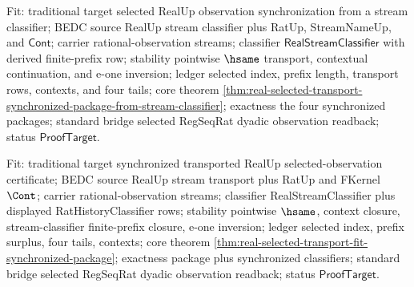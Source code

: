 Fit: traditional target selected RealUp observation synchronization from a
stream classifier; BEDC source RealUp stream classifier plus RatUp,
StreamNameUp, and $\mathsf{Cont}$; carrier rational-observation streams;
classifier $\mathsf{RealStreamClassifier}$ with derived finite-prefix row;
stability pointwise $\hsame$ transport, contextual continuation, and e-one
inversion; ledger selected index, prefix length, transport rows, contexts, and
four tails; core theorem
\autoref{thm:real-selected-transport-synchronized-package-from-stream-classifier};
exactness the four synchronized packages; standard bridge selected RegSeqRat
dyadic observation readback; status $\mathsf{ProofTarget}$.

Fit: traditional target synchronized transported RealUp selected-observation
certificate; BEDC source RealUp stream transport plus RatUp and FKernel
$\Cont$; carrier rational-observation streams; classifier RealStreamClassifier
plus displayed RatHistoryClassifier rows; stability pointwise $\hsame$, context
closure, stream-classifier finite-prefix closure, e-one inversion; ledger
selected index, prefix surplus, four tails, contexts; core theorem
\autoref{thm:real-selected-transport-fit-synchronized-package}; exactness
package plus synchronized classifiers; standard bridge selected RegSeqRat
dyadic observation readback; status $\mathsf{ProofTarget}$.

